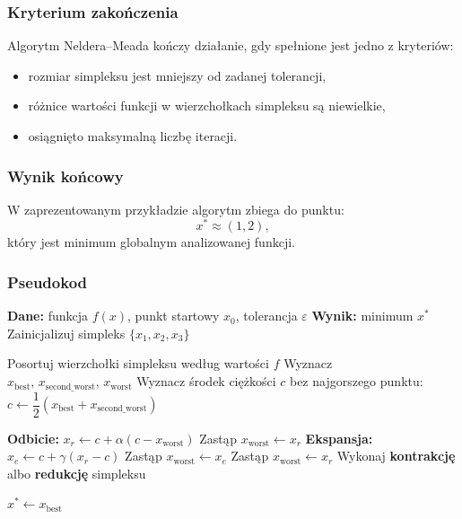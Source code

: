 \documentclass[10pt,a4paper]{article}
\begin{document}
\subsubsection{Kryterium zakończenia}

Algorytm Neldera--Meada kończy działanie, gdy spełnione jest jedno z kryteriów:
\begin{itemize}
\item rozmiar simpleksu jest mniejszy od zadanej tolerancji,
\item różnice wartości funkcji w wierzchołkach simpleksu są niewielkie,
\item osiągnięto maksymalną liczbę iteracji.
\end{itemize}



\subsubsection{Wynik końcowy}

W zaprezentowanym przykładzie algorytm zbiega do punktu:
\[
x^* \approx (1,2),
\]
który jest minimum globalnym analizowanej funkcji.



\subsubsection{Pseudokod}

\begin{algorithm}[H]
\caption{Metoda Neldera--Meada (simpleksowa)}
\begin{algorithmic}[1]
\STATE \textbf{Dane:} funkcja $f(x)$, punkt startowy $x_0$, tolerancja $\varepsilon$
\STATE \textbf{Wynik:} minimum $x^\ast$
\STATE Zainicjalizuj simpleks $\{x_1, x_2, x_3\}$

    \STATE Posortuj wierzchołki simpleksu według wartości $f$
    \STATE Wyznacz $x_{\text{best}},\, x_{\text{second\_worst}},\, x_{\text{worst}}$
    \STATE Wyznacz środek ciężkości $c$ bez najgorszego punktu:
    \STATE \hspace{0.5cm} $c \leftarrow \dfrac{1}{2}\left(x_{\text{best}} + x_{\text{second\_worst}}\right)$

    \STATE \textbf{Odbicie:} $x_r \leftarrow c + \alpha\left(c - x_{\text{worst}}\right)$
        \STATE Zastąp $x_{\text{worst}} \leftarrow x_r$
    \ELSE
            \STATE \textbf{Ekspansja:} $x_e \leftarrow c + \gamma\left(x_r - c\right)$
                \STATE Zastąp $x_{\text{worst}} \leftarrow x_e$
            \ELSE
                \STATE Zastąp $x_{\text{worst}} \leftarrow x_r$
            \ENDIF
        \ELSE
            \STATE Wykonaj \textbf{kontrakcję} albo \textbf{redukcję} simpleksu
        \ENDIF
    \ENDIF
\ENDWHILE

\STATE $x^\ast \leftarrow x_{\text{best}}$
\end{algorithmic}
\end{algorithm}
\end{document}
